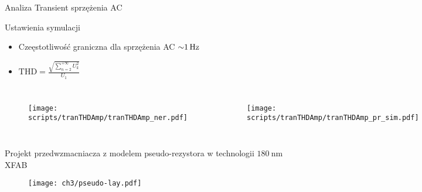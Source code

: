\begin{frame}{Analiza Transient sprzężenia AC}
    \begin{block}{Ustawienia symulacji}
\begin{itemize}
    \item Czeęstotliwość graniczna dla sprzężenia AC $\SI{\sim 1}{\hertz}$
    \item $\mathrm{THD} = \frac{\sqrt{\sum_{n=2}^{+\infty} U_k^2}}{U_1}$
\end{itemize}
    \end{block}


    \begin{columns}
        \begin{figure}[H]
            \centering
            \texttt{[image: scripts/tranTHDAmp/tranTHDAmp\_ner.pdf]}
        \end{figure}
        \begin{figure}[H]
            \centering
            \texttt{[image: scripts/tranTHDAmp/tranTHDAmp\_pr\_sim.pdf]}
        \end{figure}
    \end{columns}

\end{frame}



\begin{frame}{Projekt przedwzmacniacza z modelem pseudo-rezystora w technologii $\SI{180}{\nano\metre}$  XFAB}
    \begin{figure}[H]
        \centering
        \texttt{[image: ch3/pseudo-lay.pdf]} 

    \end{figure}


\end{frame}

